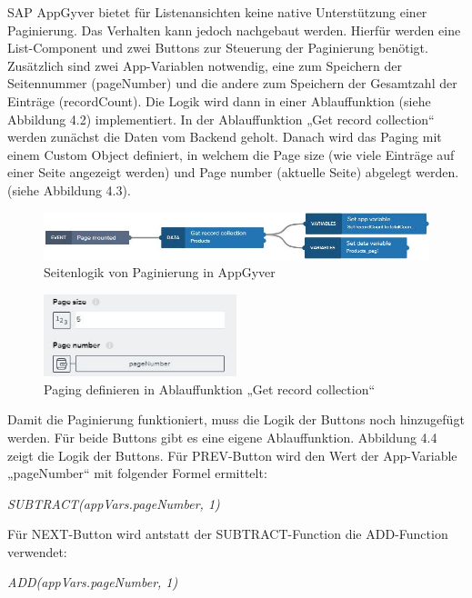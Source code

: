 SAP AppGyver bietet für Listenansichten keine native Unterstützung einer Paginierung. Das Verhalten kann jedoch nachgebaut werden. Hierfür werden eine List-Component und zwei Buttons zur Steuerung der Paginierung benötigt. Zusätzlich sind zwei App-Variablen notwendig, eine zum Speichern der Seitennummer (pageNumber) und die andere zum Speichern der Gesamtzahl der Einträge (recordCount). Die Logik wird dann in einer Ablauffunktion (siehe Abbildung 4.2) implementiert. In der Ablauffunktion „Get record collection“ werden zunächst die Daten vom Backend geholt. Danach wird das Paging mit einem Custom Object definiert, in welchem die Page size (wie viele Einträge auf einer Seite angezeigt werden) und Page number  (aktuelle Seite) abgelegt werden. (siehe Abbildung 4.3).

\begin{figure}[htbp]
 \centering
 \includegraphics[width=1.0\textwidth]{Bilder/appgyver/4_2_Seitenlogic paginierung.jpg}
 \caption{Seitenlogik von Paginierung in AppGyver}
\end{figure}
 
\begin{figure}[htbp]
 \centering
 \includegraphics[width=0.5\textwidth]{Bilder/appgyver/4_3_Paging_definieren.jpg}
 \caption{Paging definieren in Ablauffunktion „Get record collection“}
\end{figure}

Damit die Paginierung funktioniert, muss die Logik der Buttons noch hinzugefügt werden. Für beide Buttons gibt es eine eigene Ablauffunktion. Abbildung 4.4 zeigt die Logik der Buttons. Für PREV-Button wird den Wert der App-Variable „pageNumber“ mit folgender Formel ermittelt: 

\textit{\footnotesize SUBTRACT(appVars.pageNumber, 1)} 

Für NEXT-Button wird antstatt der SUBTRACT-Function die ADD-Function verwendet: 

\textit{\footnotesize ADD(appVars.pageNumber, 1)}

